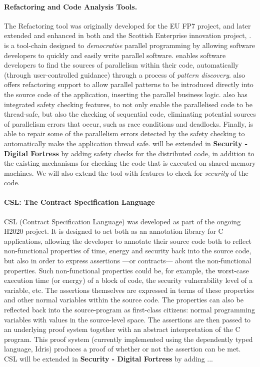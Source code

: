 \documentclass[a4paper,11pt]{article}
\newcommand{\project}[1]{\textbf{#1}\xspace}
\newcommand{\SECURITY}{\project{Security - Digital Fortress}}
\newcommand{\TheProject}{\SECURITY}
\begin{document}
\paragraph{\SAshort{} \paraformance Refactoring and Code Analysis Tools.}


The \paraformance Refactoring tool was originally developed for the EU FP7 \paraphrase{} project, and later extended and enhanced in both \rephrase{} and the Scottish Enterprise innovation project, \paraformance{}. 
\paraformance is a tool-chain designed to \emph{democratise} parallel programming by allowing software developers to quickly and easily write parallel software. \paraformance enables software developers to find the sources of parallelism within their code, automatically (through user-controlled guidance) through a process of \emph{pattern discovery}. \paraformance also offers refactoring support to allow parallel patterns to be introduced directly into the source code of the application, inserting the parallel business logic. \paraformance also has integrated safety checking features, to not only enable  the parallelised code to be thread-safe, but also the checking of sequential code, eliminating potential sources of parallelism errors that occur, such as race conditions and deadlocks. Finally, \paraformance is able to repair some of the parallelism errors detected by the safety checking to automatically make the application thread safe. \paraformance will be extended in \TheProject{} by adding safety checks for the distributed code, in addition to the existing mechanisms for checking the code that is executed on shared-memory machines. We will also extend the tool with features to check for \emph{security} of the code. 

\paragraph {\SAshort{} CSL: The Contract Specification Language}
CSL (Contract Specification Language) was developed as part of the ongoing H2020 \teamplay{} project. It is designed to act both as an annotation library for C applications, allowing the developer to annotate their source code both to reflect non-functional properties of time, energy and security back into the source code, but also in order to express assertions ---or contracts--- about the non-functional properties. Such non-functional properties could be, for example, the worst-case execution time (or energy) of a block of code, the security vulnerability level of a variable, etc. The assertions themselves are expressed in terms of these properties and other normal variables within the source code. The properties can also be reflected back into the source-program as first-class citizens: normal programming variables with values in the source-level space.
The assertions are then passed to an underlying proof system together with an abstract interpretation of the C program. This proof system (currently implemented using the dependently typed language, Idris) produces  a proof of whether or not the assertion can be met. CSL will be extended in \TheProject{} by adding ... 
\end{document}
